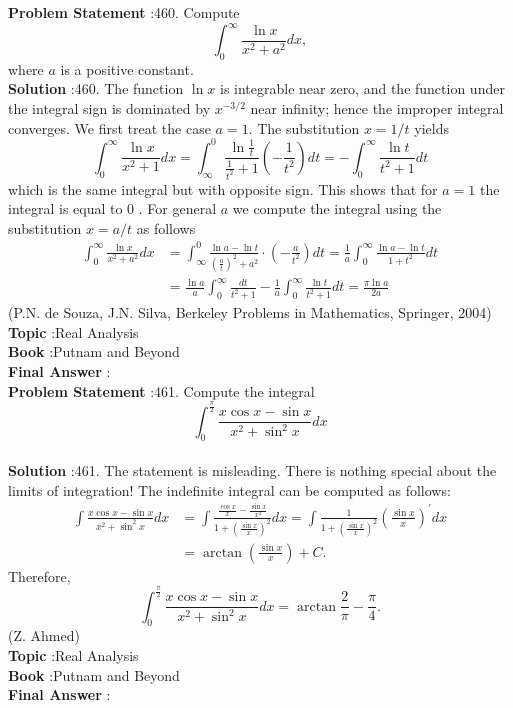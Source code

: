\documentclass[10pt]{article}
\begin{document}
\textbf{Problem Statement} :460. Compute$$ \int_{0}^{\infty} \frac{\ln x}{x^{2}+a^{2}} d x, $$where $a$ is a positive constant.\\
\textbf{Solution} :460. The function $\ln x$ is integrable near zero, and the function under the integral sign is dominated by $x^{-3 / 2}$ near infinity; hence the improper integral converges. We first treat the case $a=1$. The substitution $x=1 / t$ yields$$ \int_{0}^{\infty} \frac{\ln x}{x^{2}+1} d x=\int_{\infty}^{0} \frac{\ln \frac{1}{t}}{\frac{1}{t^{2}}+1}\left(-\frac{1}{t^{2}}\right) d t=-\int_{0}^{\infty} \frac{\ln t}{t^{2}+1} d t $$which is the same integral but with opposite sign. This shows that for $a=1$ the integral is equal to 0 . For general $a$ we compute the integral using the substitution $x=a / t$ as follows$$ \begin{aligned} \int_{0}^{\infty} \frac{\ln x}{x^{2}+a^{2}} d x &=\int_{\infty}^{0} \frac{\ln a-\ln t}{\left(\frac{a}{t}\right)^{2}+a^{2}} \cdot\left(-\frac{a}{t^{2}}\right) d t=\frac{1}{a} \int_{0}^{\infty} \frac{\ln a-\ln t}{1+t^{2}} d t \\ &=\frac{\ln a}{a} \int_{0}^{\infty} \frac{d t}{t^{2}+1}-\frac{1}{a} \int_{0}^{\infty} \frac{\ln t}{t^{2}+1} d t=\frac{\pi \ln a}{2 a} \end{aligned} $$(P.N. de Souza, J.N. Silva, Berkeley Problems in Mathematics, Springer, 2004)\\
\textbf{Topic} :Real Analysis\\
\textbf{Book} :Putnam and Beyond\\
\textbf{Final Answer} :\\


\textbf{Problem Statement} :461. Compute the integral$$ \int_{0}^{\frac{\pi}{2}} \frac{x \cos x-\sin x}{x^{2}+\sin ^{2} x} d x $$\\
\textbf{Solution} :461. The statement is misleading. There is nothing special about the limits of integration! The indefinite integral can be computed as follows:$$ \begin{aligned} \int \frac{x \cos x-\sin x}{x^{2}+\sin ^{2} x} d x &=\int \frac{\frac{\cos x}{x}-\frac{\sin x}{x^{2}}}{1+\left(\frac{\sin x}{x}\right)^{2}} d x=\int \frac{1}{1+\left(\frac{\sin x}{x}\right)^{2}}\left(\frac{\sin x}{x}\right)^{\prime} d x \\ &=\arctan \left(\frac{\sin x}{x}\right)+C . \end{aligned} $$Therefore,$$ \int_{0}^{\frac{\pi}{2}} \frac{x \cos x-\sin x}{x^{2}+\sin ^{2} x} d x=\arctan \frac{2}{\pi}-\frac{\pi}{4} . $$(Z. Ahmed)\\
\textbf{Topic} :Real Analysis\\
\textbf{Book} :Putnam and Beyond\\
\textbf{Final Answer} :\\
\end{document}
